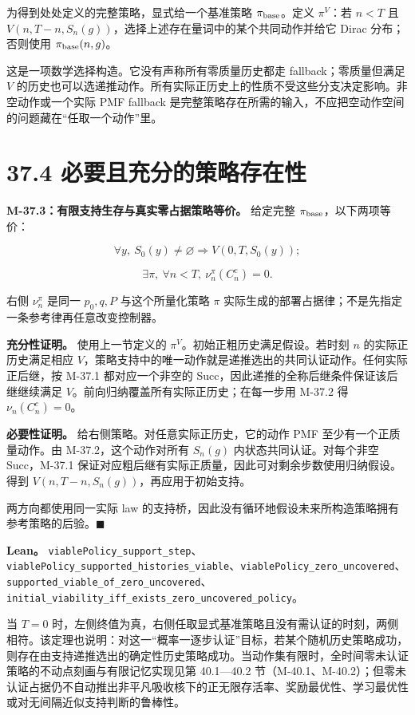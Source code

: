 \documentclass[
  11pt,
  oneside]{book}
\begin{document}
为得到处处定义的完整策略，显式给一个基准策略 \(\pi_{\rm base}\)。定义 \(\pi^V\)：若 \(n<T\) 且 \(V(n,T-n,S_n(g))\)，选择上述存在量词中的某个共同动作并给它 Dirac 分布；否则使用 \(\pi_{\rm base}(n,g)\)。

这是一项数学选择构造。它没有声称所有零质量历史都走 fallback；零质量但满足 \(V\) 的历史也可以选递推动作。所有实际正历史上的性质不受这些分支决定影响。非空动作或一个实际 PMF fallback 是完整策略存在所需的输入，不应把空动作空间的问题藏在``任取一个动作''里。

\section{37.4 必要且充分的策略存在性}\label{ux5fc5ux8981ux4e14ux5145ux5206ux7684ux7b56ux7565ux5b58ux5728ux6027}

\hypertarget{m-37-3}{}\label{m-37-3}

\textbf{M-37.3：有限支持生存与真实零占据策略等价。} 给定完整 \(\pi_{\rm base}\)，以下两项等价：

\[\forall y,\ S_0(y)\ne\varnothing\Rightarrow V(0,T,S_0(y));\]

\[\exists\pi,\ \forall n<T,\ \nu_n^\pi(C_n^c)=0.\]

右侧 \(\nu_n^\pi\) 是同一 \(p_0,q,P\) 与这个所量化策略 \(\pi\) 实际生成的部署占据律；不是先指定一条参考律再任意改变控制器。

\textbf{充分性证明。} 使用上一节定义的 \(\pi^V\)。初始正粗历史满足假设。若时刻 \(n\) 的实际正历史满足相应 \(V\)，策略支持中的唯一动作就是递推选出的共同认证动作。任何实际正后继，按 M-37.1 都对应一个非空的 Succ，因此递推的全称后继条件保证该后继继续满足 \(V\)。前向归纳覆盖所有实际正历史；在每一步用 M-37.2 得 \(\nu_n(C_n^c)=0\)。

\textbf{必要性证明。} 给右侧策略。对任意实际正历史，它的动作 PMF 至少有一个正质量动作。由 M-37.2，这个动作对所有 \(S_n(g)\) 内状态共同认证。对每个非空 Succ，M-37.1 保证对应粗后继有实际正质量，因此可对剩余步数使用归纳假设。得到 \(V(n,T-n,S_n(g))\)，再应用于初始支持。

两方向都使用同一实际 law 的支持桥，因此没有循环地假设未来所构造策略拥有参考策略的后验。\(\blacksquare\)

\textbf{Lean。} \nolinkurl{viablePolicy_support_step}、\nolinkurl{viablePolicy_supported_histories_viable}、\nolinkurl{viablePolicy_zero_uncovered}、\nolinkurl{supported_viable_of_zero_uncovered}、\nolinkurl{initial_viability_iff_exists_zero_uncovered_policy}。

当 \(T=0\) 时，左侧终值为真，右侧任取显式基准策略且没有需认证的时刻，两侧相符。该定理也说明：对这一``概率一逐步认证''目标，若某个随机历史策略成功，则存在由支持递推选出的确定性历史策略成功。当动作集有限时，全时间零未认证策略的不动点刻画与有限记忆实现见第 40.1---40.2 节（M-40.1、M-40.2）；但零未认证占据仍不自动推出非平凡吸收核下的正无限存活率、奖励最优性、学习最优性或对无间隔近似支持判断的鲁棒性。
\end{document}
